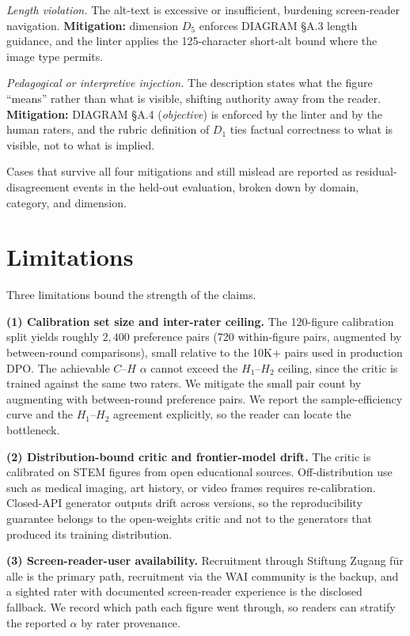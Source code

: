 \documentclass[pdflatex,sn-mathphys-num]{sn-jnl}
\begin{document}
\emph{Length violation.} The alt-text is excessive or insufficient, burdening screen-reader navigation. \textbf{Mitigation:} dimension $D_5$ enforces DIAGRAM §A.3 length guidance, and the linter applies the 125-character short-alt bound where the image type permits.

\emph{Pedagogical or interpretive injection.} The description states what the figure ``means'' rather than what is visible, shifting authority away from the reader. \textbf{Mitigation:} DIAGRAM §A.4 (\emph{objective}) is enforced by the linter and by the human raters, and the rubric definition of $D_1$ ties factual correctness to what is visible, not to what is implied.

Cases that survive all four mitigations and still mislead are reported as residual-disagreement events in the held-out evaluation, broken down by domain, category, and dimension.

\section{Limitations}\label{sec:limitations}

Three limitations bound the strength of the claims.

\textbf{(1) Calibration set size and inter-rater ceiling.} The 120-figure calibration split yields roughly $2{,}400$ preference pairs (720 within-figure pairs, augmented by between-round comparisons), small relative to the 10K+ pairs used in production DPO. The achievable $C$--$H$ $\alpha$ cannot exceed the $H_1$--$H_2$ ceiling, since the critic is trained against the same two raters. We mitigate the small pair count by augmenting with between-round preference pairs. We report the sample-efficiency curve and the $H_1$--$H_2$ agreement explicitly, so the reader can locate the bottleneck.

\textbf{(2) Distribution-bound critic and frontier-model drift.} The critic is calibrated on STEM figures from open educational sources. Off-distribution use such as medical imaging, art history, or video frames requires re-calibration. Closed-API generator outputs drift across versions, so the reproducibility guarantee belongs to the open-weights critic and not to the generators that produced its training distribution.

\textbf{(3) Screen-reader-user availability.} Recruitment through Stiftung Zugang f\"ur alle is the primary path, recruitment via the WAI community is the backup, and a sighted rater with documented screen-reader experience is the disclosed fallback. We record which path each figure went through, so readers can stratify the reported $\alpha$ by rater provenance.
\end{document}
